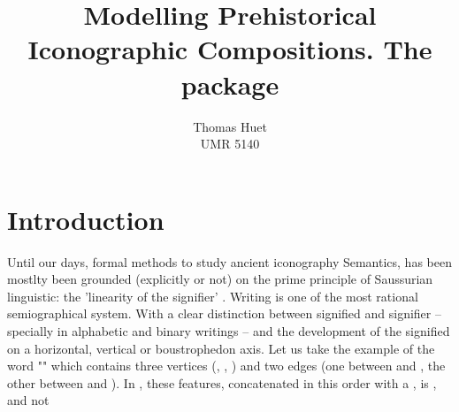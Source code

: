 \documentclass[article]{jss}\usepackage[]{graphicx}\usepackage[]{color}
\author{Thomas Huet\\UMR 5140}
\title{Modelling Prehistorical Iconographic Compositions. The \proglang{R} package \pkg{decorr}}
\begin{document}

\section[Introduction]{Introduction} \label{sec:intro}

Until our days, formal methods to study ancient iconography Semantics, has been mostlty been grounded (explicitly or not) on the prime principle of Saussurian linguistic: the 'linearity of the signifier' \citep{Saussure89}.  
Writing is one of the most rational semiographical system. With a clear distinction between signified and signifier -- specially in alphabetic and binary writings -- and the development of the signified on a horizontal, vertical or boustrophedon axis. 
Let us take the example of the word "" which contains three vertices (, , ) and two edges (one between  and , the other between  and ). In , these features, concatenated in this order with a , is , and not 
\end{document}
